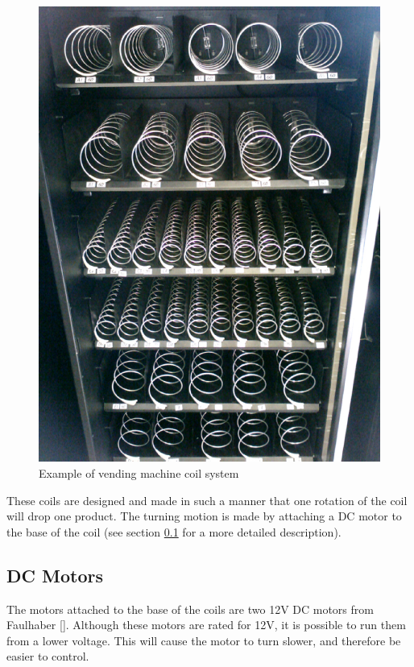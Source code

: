 \begin{figure}
\centering
\includegraphics[scale=0.2]{vm_coils.eps}
\caption{Example of vending machine coil system}
\label{fig:vm-coils}
\end{figure}

These coils are designed and made in such a manner that one rotation of the coil will drop one
product. The turning motion is made by attaching a DC motor to the base of the coil (see
section \ref{sec:dc-motor} for a more detailed description).

\subsection{DC Motors}
\label{sec:dc-motor}

The motors attached to the base of the coils are two 12V DC motors from Faulhaber
[\cite{manual:dc-motors}]. Although these motors are rated for 12V, it is possible to run them
from a lower voltage. This will cause the motor to turn slower, and therefore be easier to
control. 


